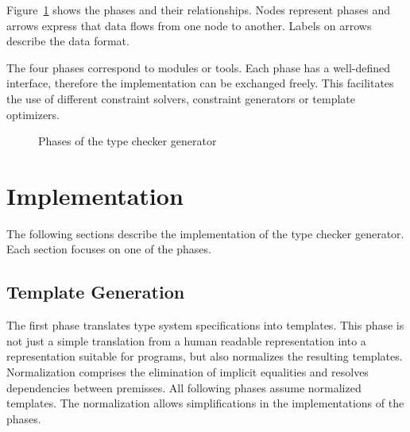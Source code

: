Figure~\ref{fig:phases} shows the phases and their
relationships. Nodes represent phases and arrows express that data
flows from one node to another. Labels on arrows describe the data
format.

The four phases correspond to modules or tools. Each phase has a
well-defined interface, therefore the implementation can be exchanged
freely. This facilitates the use of different constraint solvers,
constraint generators or template optimizers.

\begin{figure}
\caption{Phases of the type checker generator}
\label{fig:phases}
\end{figure}
\section{Implementation}
\label{sec:implementation}
The following sections describe the implementation of the type checker
generator. Each section focuses on one of the phases.

\subsection{Template Generation}
\label{sec:constraint-templates}
The first phase translates type system specifications into
templates. This phase is not just a simple translation from a human
readable representation into a representation suitable for programs,
but also normalizes the resulting templates. Normalization comprises
the elimination of implicit equalities and resolves dependencies
between premisses. All following phases assume normalized templates.
The normalization allows simplifications in the implementations of the
phases.

